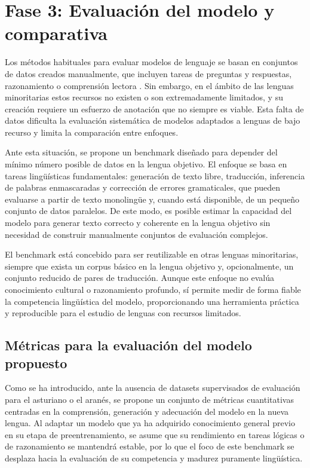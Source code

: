 \chapter{Fase 3: Evaluación del modelo y comparativa}
\label{ch:benchmark}

Los métodos habituales para evaluar modelos de lenguaje se basan en conjuntos de datos creados manualmente, que incluyen tareas de preguntas y respuestas, razonamiento o comprensión lectora \cite{perez-ortiz-etal-2024-expanding, gonzalez2026iberbench, srivastava2022bigbench}. Sin embargo, en el ámbito de las lenguas minoritarias estos recursos no existen o son extremadamente limitados, y su creación requiere un esfuerzo de anotación que no siempre es viable. Esta falta de datos dificulta la evaluación sistemática de modelos adaptados a lenguas de bajo recurso y limita la comparación entre enfoques.

Ante esta situación, se propone un benchmark diseñado para depender del mínimo número posible de datos en la lengua objetivo. El enfoque se basa en tareas lingüísticas fundamentales: generación de texto libre, traducción, inferencia de palabras enmascaradas y corrección de errores gramaticales, que pueden evaluarse a partir de texto monolingüe y, cuando está disponible, de un pequeño conjunto de datos paralelos. De este modo, es posible estimar la capacidad del modelo para generar texto correcto y coherente en la lengua objetivo sin necesidad de construir manualmente conjuntos de evaluación complejos.

El benchmark está concebido para ser reutilizable en otras lenguas minoritarias, siempre que exista un corpus básico en la lengua objetivo y, opcionalmente, un conjunto reducido de pares de traducción. Aunque este enfoque no evalúa conocimiento cultural o razonamiento profundo, sí permite medir de forma fiable la competencia lingüística del modelo, proporcionando una herramienta práctica y reproducible para el estudio de lenguas con recursos limitados.

\section{Métricas para la evaluación del modelo propuesto}

Como se ha introducido, ante la ausencia de datasets supervisados de evaluación para el asturiano o el aranés, se propone un conjunto de métricas cuantitativas centradas en la comprensión, generación y adecuación del modelo en la nueva lengua. Al adaptar un modelo que ya ha adquirido conocimiento general previo en su etapa de preentrenamiento, se asume que su rendimiento en tareas lógicas o de razonamiento se mantendrá estable, por lo que el foco de este benchmark se desplaza hacia la evaluación de su competencia y madurez puramente lingüística.

